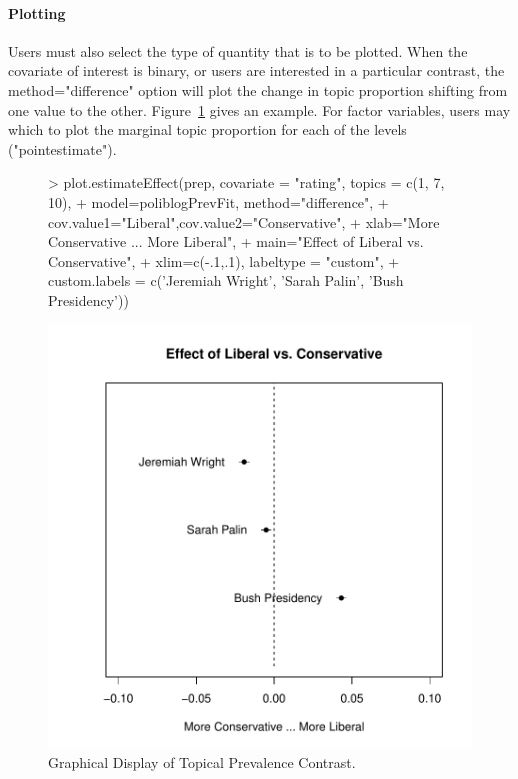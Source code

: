 \documentclass[nojss]{jss}
\begin{document}
\paragraph{Plotting}

Users must also select the type of quantity that is to be plotted. When the covariate of interest is binary, or users are interested in a particular contrast, the method="difference" option will plot the change in topic proportion shifting from one value to the other. Figure~\ref{fig:difference} gives an example. For factor variables, users may which to plot the marginal topic proportion for each of the levels ("pointestimate").


\begin{figure}[t!]
\begin{center}
\begin{Schunk}
\begin{Sinput}
> plot.estimateEffect(prep, covariate = "rating", topics = c(1, 7, 10),
+         model=poliblogPrevFit, method="difference",
+         cov.value1="Liberal",cov.value2="Conservative",
+         xlab="More Conservative ... More Liberal",
+         main="Effect of Liberal vs. Conservative",
+         xlim=c(-.1,.1), labeltype = "custom",
+         custom.labels = c('Jeremiah Wright', 'Sarah Palin', 'Bush Presidency'))
\end{Sinput}
\end{Schunk}
\includegraphics{stmVignette-014}
\caption{Graphical Display of Topical Prevalence Contrast.}
\label{fig:difference}
\end{center}
\end{figure}
\end{document}
